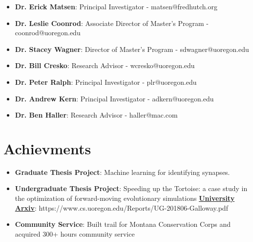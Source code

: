 \documentclass[letterpaper,11pt]{article}
\let\oldhref\href
\renewcommand{\href}[2]{\oldhref{#1}{\bfseries#2}}
\newcommand{\resumeNoWrapItem}[2]{
  \item\small{
    \textbf{#1}{: #2 \vspace{-2pt}}
  }
}
\newcommand{\resumeSubItem}[2]{\resumeNoWrapItem{#1}{#2}\vspace{-4pt}}
\newcommand{\resumeSubHeadingListStart}{\begin{itemize}[leftmargin=*]}
\newcommand{\resumeSubHeadingListEnd}{\end{itemize}}
\begin{document}
\resumeSubHeadingListStart
    
    \resumeSubItem {Dr. Erick Matsen}
        {Principal Investigator -
        matsen@fredhutch.org}
    \resumeSubItem {Dr. Leslie Coonrod}
        {Associate Director of Master's Program -
        coonrod@uoregon.edu}
    \resumeSubItem {Dr. Stacey Wagner}
        {Director of Master's Program -
        sdwagner@uoregon.edu}
    \resumeSubItem {Dr. Bill Cresko}
        {Research Advisor -
        wcresko@uoregon.edu}
    \resumeSubItem {Dr. Peter Ralph}
        {Principal Investigator -
        plr@uoregon.edu}
    \resumeSubItem {Dr. Andrew Kern}
        {Principal Investigator -
        adkern@uoregon.edu}
    \resumeSubItem {Dr. Ben Haller}
        {Research Advisor - 
        haller@mac.com}
\resumeSubHeadingListEnd

\section{Achievments}

\resumeSubHeadingListStart
    \resumeSubItem{Graduate Thesis Project}
    {
        Machine learning for identifying synapses.
    } %
    \resumeSubItem{Undergraduate Thesis Project}
    {
        Speeding up the Tortoise: a case study in the optimization of forward-moving evolutionary simulations
    }\href{https://www.cs.uoregon.edu/Reports/UG-201806-Galloway.pdf}{University Arxiv}: https://www.cs.uoregon.edu/Reports/UG-201806-Galloway.pdf
    \resumeSubItem{Community Service}
    {
        Built trail for Montana Conservation Corps and acquired 300+
        hours community service
    }
\resumeSubHeadingListEnd
\end{document}
